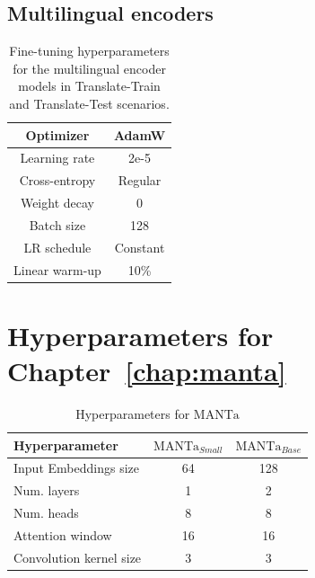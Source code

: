 \begin{appendices}
\subsection{Multilingual encoders}
\label{app:ft_multi_enc}
\begin{table}[H]
\centering \small
\begin{tabular}{c|c}
\toprule
Optimizer        &   AdamW         \\ \hline
Learning rate        &   2e-5         \\ \hline
Cross-entropy  &  Regular    \\ \hline
Weight decay  &     0      \\ \hline
Batch size & 128 \\ \hline
LR schedule & Constant \\ \hline
Linear warm-up & 10\% \\ \bottomrule
\end{tabular}
\caption{Fine-tuning hyperparameters for the multilingual encoder models in Translate-Train and Translate-Test scenarios.}
\label{tab:ft_multi_enc}
\end{table}

\section{Hyperparameters for Chapter~\ref{chap:manta}}
\label{sec:appendix_hp}
\begin{table}[H]
\centering\small
\begin{tabular}{lcc}
\toprule
Hyperparameter                                   & $\text{MANTa}_{Small}$  & $\text{MANTa}_{Base}$ \\ \midrule
Input Embeddings size          & 64 & 128         \\
Num. layers  & 1 & 2        \\
Num. heads  & 8 & 8        \\
Attention window & 16 & 16        \\
Convolution kernel size & 3 & 3        \\ \bottomrule
\end{tabular}
\caption{Hyperparameters for $\text{MANTa}$}
\label{tab:hp_fp}
\end{table}


\end{appendices}
